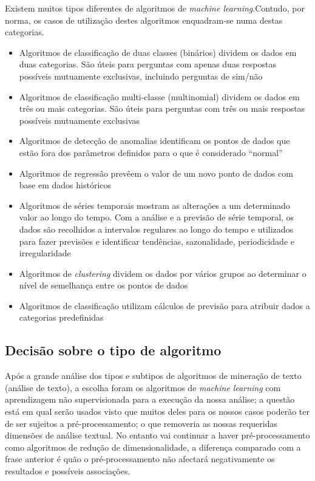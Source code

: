 Existem muitos tipos diferentes de algoritmos de \textit{machine learning}.Contudo, por norma, os casos de utilização destes algoritmos enquadram-se numa destas categorias.
\begin{itemize}
  \setlength\itemsep{0.05em}
  \item Algoritmos de classificação de duas classes (binários) dividem os dados em duas categorias. São úteis para perguntas com apenas duas respostas possíveis mutuamente exclusivas, incluindo perguntas de sim/não
  \item Algoritmos de classificação multi-classe (multinomial) dividem os dados em três ou mais categorias. São úteis para perguntas com três ou mais respostas possíveis mutuamente exclusivas
  \item Algoritmos de detecção de anomalias identificam os pontos de dados que estão fora dos parâmetros definidos para o que é considerado ``normal''
  \item Algoritmos de regressão prevêem o valor de um novo ponto de dados com base em dados históricos
  \item Algoritmos de séries temporais mostram as alterações a um determinado valor ao longo do tempo. Com a análise e a previsão de série temporal, os dados são recolhidos a intervalos regulares ao longo do tempo e utilizados para fazer previsões e identificar tendências, sazonalidade, periodicidade e irregularidade
  \item Algoritmos de \textit{clustering} dividem os dados por vários grupos ao determinar o nível de semelhança entre os pontos de dados
  \item Algoritmos de classificação utilizam cálculos de previsão para atribuir dados a categorias predefinidas
\end{itemize}

\subsection{Decisão sobre o tipo de algoritmo}

Após a grande análise dos tipos e subtipos de algoritmos de mineração de texto (análise de texto), a escolha foram os algoritmos de \textit{machine learning} com aprendizagem não supervisionada para a execução da nossa análise; a questão está em qual serão usados visto que muitos deles para os nossos casos poderão ter de ser sujeitos a pré-processamento; o que removeria as nossas requeridas dimensões de análise textual.
No entanto vai continuar a haver pré-processamento como algoritmos de redução de dimensionalidade, a diferença comparado com a frase anterior é quão o pré-processamento não afectará negativamente os resultados e possíveis associações.

